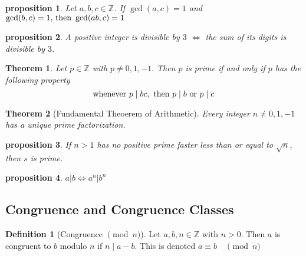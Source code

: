 \documentclass{article}
\newtheorem{theorem}{Theorem}[section]
\newtheorem{proposition}{Proposition}[section]
\newtheorem{proposition}{proposition}[section]
\theoremstyle{definition}
\newtheorem{definition}{Definition}[section]
\theoremstyle{remark}
\begin{document}
\begin{proposition}
Let $ a,b,c \in \mathbb{Z}$. If $\gcd(a,c) = 1 $ and $\gcd(b,c)=1 \textnormal{, then }\gcd(ab,c) = 1 $
\end{proposition}



\begin{proposition}
A positive integer is divisible by $3$ $\iff$ the sum of its digits is divisible by $3$.
\end{proposition}

\begin{theorem}\label{thm:prime_dividing_product}
Let \(p \in \mathbb{Z}\) with \(p \neq 0,1, -1.\) Then \(p\) is prime if and only if \(p\) has the following property
\[
\textnormal{whenever } p \mid bc, \textnormal{ then } p \mid b \textnormal{ or } p \mid c
\]
\end{theorem}



\begin{theorem}[Fundamental Theoerem of Arithmetic]\label{thm:fund_thm_of_arith}
Every integer \(n \neq 0, 1, -1\) has a unique prime factorization.
\end{theorem}







\begin{proposition}
If $n>1$ has no positive prime faster less than or equal to $\sqrt{n}$, then $s$ is prime.
\end{proposition}

\begin{proposition}
$a|b \iff a^n | b^n$
\end{proposition}




\subsection{Congruence and Congruence Classes}







\begin{definition}[Congruence $\pmod{n}$]
Let $a,b,n \in \mathbb{Z}$ with $n>0$. Then $a$ is congruent to $b$ modulo $n$ if $n \mid a-b$. This is denoted $ a \equiv b \quad \pmod{n}$

\end{definition}
\end{document}
